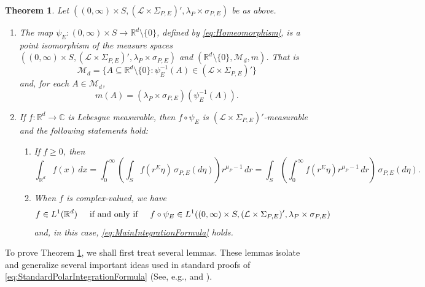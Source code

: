 \documentclass[11pt]{article}
\newtheorem{theorem}{Theorem}[section]
\theoremstyle{remark}
\begin{document}
\begin{theorem}\label{thm:MainIntegrationFormula}
Let $((0,\infty)\times S,(\mathcal{L}\times\Sigma_{P,E})',\lambda_P\times\sigma_{P,E})$ be as above.
\begin{enumerate}
\item\label{item:MainIntegrationFormula1} The map $\psi_E: (0,\infty)\times S\to\mathbb{R}^d\setminus\{0\}$, defined by \eqref{eq:Homeomorphism}, is a point isomorphism of the measure spaces $((0,\infty)\times S,(\mathcal{L}\times\Sigma_{P,E})',\lambda_P\times\sigma_{P,E})$ and $(\mathbb{R}^d\setminus\{0\},\mathcal{M}_d,m)$. That is
\begin{equation*}
\mathcal{M}_d=\{A\subseteq \mathbb{R}^d\setminus\{0\}:\psi_E^{-1}(A)\in(\mathcal{L}\times\Sigma_{P,E})'\}
\end{equation*}
and, for each $A\in\mathcal{M}_d$,
\begin{equation*}
m(A)=(\lambda_P\times\sigma_{P,E})(\psi_E^{-1}(A)).
\end{equation*}
\item\label{item:MainintegrationFormula2} If $f:\mathbb{R}^d\to\mathbb{C}$ is Lebesgue measurable, then $f\circ \psi_E$ is $(\mathcal{L}\times\Sigma_{P,E})'$-measurable and the following statements hold:
\begin{enumerate}
\item If $f\geq 0$, then
\begin{equation}\label{eq:MainIntegrationFormula}
\int_{\mathbb{R}^d}f(x)\,dx=\int_0^\infty\left(\int_S f(r^E\eta)\,\sigma_{P,E}(d\eta)\right)r^{\mu_P-1}\,dr=\int_S\left(\int_0^\infty f(r^E\eta)r^{\mu_P-1}\,dr\right)\,\sigma_{P,E}(d\eta).
\end{equation}
\item When $f$ is complex-valued, we have 
\begin{equation*}f\in L^1(\mathbb{R}^d)\hspace{.5cm}\mbox{if and only if}\hspace{0.5cm}f\circ\psi_E\in L^1((0,\infty)\times S,(\mathcal{L}\times \Sigma_{P,E})',\lambda_P\times\sigma_{P,E})
\end{equation*}
and, in this case, \eqref{eq:MainIntegrationFormula} holds.
\end{enumerate}
\end{enumerate}
\end{theorem}

\noindent To prove Theorem \ref{thm:MainIntegrationFormula}, we shall first treat several lemmas. These lemmas isolate and generalize several important ideas used in standard proofs of \eqref{eq:StandardPolarIntegrationFormula} (See, e.g., \cite{folland_real_2013} and \cite{stein_real_2009}). 
\end{document}
